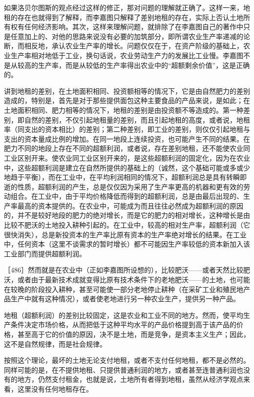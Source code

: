 如果洛贝尔图斯的观点经过这样的修正，那对问题的理解就正确了。这样一来，地租的存在也就得到了解释，而李嘉图只解释了差别地租的存在，实际上否认土地所有权有任何经济影响。其次，这样来理解问题，就排除了在李嘉图自己的著作中只是任意加上的、对他的思路来说没有必要的加筑部分，即所谓农业生产率递减的论断，而相反地，承认农业生产率的增长。问题仅仅在于，在资产阶级的基础上，农业生产率相对地低于工业，换句话说，农业劳动生产力的发展比工业慢。李嘉图不是从较高的生产率，而是从较低的生产率得出农业中的“超额剩余价值”，这是正确的。


讲到地租的差别，在土地面积相同、投资额相等的情况下，它是由自然肥力的差别造成的，特别是，首先是对于那些提供面包这种主要食品的产品来说，是如此；在土地面积相同、肥力相等的情况下，地租的差别是由投资额不等造成的。第一种差别，即自然的差别，不仅引起地租量的差别，而且引起地租的高度，或者说，地租率（同支出的资本相比）的差别；第二种差别，即工业的差别，则仅仅引起地租与支出的资本量成比例的增加。在同一地段上连续投资，也可能产生不同的结果。在肥力不同的地段上存在不同的超额利润，或者说，存在差别地租，还不能使农业同工业区别开来。使农业同工业区别开来的，是这些超额利润的固定化，因为在农业中，这些超额利润是建立在自然所提供的基础上的（诚然，这个基础可能或多或少地趋于平衡），而在工业中，在平均利润相同的情况下，超额利润总是具有转瞬即逝的性质，超额利润的产生，总是仅仅因为采用了生产率更高的机器和更有效的劳动组合。在工业中，由于平均价格降低而得到的超额利润，总是由最后出现的、生产率最高的资本提供的。在农业中，可能成为而且往往必然成为超额利润的原因的，并不是较好地段的肥力的绝对增长，而是它的肥力的相对增长，这种增长是由比较不肥沃的土地投入耕种引起的。在工业中，较高的相对生产率，超额利润（它很快消失），总是新投资本的生产率比原有资本的生产率绝对增长的结果。在工业中，任何资本（这里不谈需求的暂时增长）都不可能因生产率较低的资本新加入该工业部门而提供超额利润。

［486］然而就是在农业中（正如李嘉图所设想的），比较肥沃——或者天然比较肥沃，或者由于最新技术成就变得比原有技术条件下的老地肥沃——的土地，也可能在较晚的阶段投入耕种，甚至可能使一部分老地停止耕种（在采矿工业和殖民地产品生产中就有这种情况），或者使老地进行另一种农业生产，提供另一种产品。

地租（超额利润）的差别比较固定，这是农业和工业不同的地方。然而，使平均生产条件决定市场价格，从而把低于这种平均水平的产品价格提到高于该产品的价格，甚至高于它的价值的原因，决不是土地，而是竞争，是资本主义生产；因此，这不是自然规律，而是社会规律。

按照这个理论，最坏的土地无论支付地租，或者不支付任何地租，都不是必然的。同样可能的是，在不提供地租、只提供普通利润的地方，或者甚至连普通利润也没有的地方，仍然支付租金，也就是说，土地所有者得到地租，虽然从经济学观点来看，这里没有任何地租存在。

